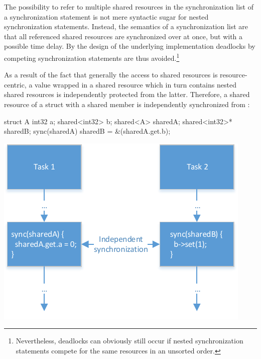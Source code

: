 The possibility to refer to multiple shared resources in the synchronization list of a synchronization statement is not mere syntactic sugar for nested synchronization statements. Instead, the semantics of a synchronization list are that all referenced shared resources are synchronized over at once, but with a possible time delay. By the design of the underlying implementation deadlocks by competing synchronization statements are thus avoided.\footnote{Nevertheless, deadlocks can obviously still occur if nested synchronization statements compete for the same resources in an unsorted order.}

As a result of the fact that generally the access to shared resources is resource-centric, a value wrapped in a shared resource which in turn contains nested shared resources is independently protected from the latter. Therefore, a shared resource of a struct with a shared member  is independently synchronized from :

\vspace{0.5cm}
\begin{minipage}{0.35\textwidth}
\begin{ccode}
struct A {
  int32 a;
  shared<int32> b; 
}
shared<A> sharedA;
shared<int32>* sharedB;
sync(sharedA) { sharedB = &(sharedA.get.b); }
\end{ccode}
\end{minipage}
\begin{minipage}{0.2\textwidth}
\begin{center}
\end{center}
\end{minipage}
\begin{minipage}{0.35\textwidth}
\includegraphics[scale=.9]{pics/ParallelExecution}
\end{minipage}

